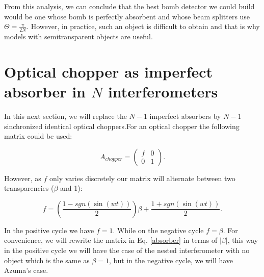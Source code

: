 \documentclass[12pt]{book}
\begin{document}
From this analysis, we can conclude that the best bomb detector we could build would be one whose bomb is perfectly absorbent and whose beam splitters use $\Theta=\frac{\pi}{2 N}$. However, in practice, such an object is difficult to obtain and that is why models with semitransparent objects are useful.
 
\section[Optical chopper]{Optical chopper as imperfect absorber in $N$ interferometers}

In this next section, we will replace the $N-1$ imperfect absorbers by $N-1$ sinchronized identical optical choppers.For an optical chopper the following matrix could be used:

\begin{equation}
A_{chopper}=\begin{pmatrix} f & 0 \\ 0 & 1 \end{pmatrix}.
\end{equation}

However, as $f$ only varies discretely our matrix will alternate between  two transparencies ($\beta$ and 1):

\begin{equation}
f=\left(\frac{1-sgn(\sin(wt))}{2} \right)\beta+\frac{1+sgn(\sin(wt))}{2}.
\end{equation}

In the positive cycle we have $f=1$. While on the negative cycle $f=\beta$. For convenience, we will rewrite the matrix in Eq. \ref{absorber} in terms of $|\beta|$, this way in the positive cycle we will have the case of the nested interferometer with no object which is the same as  $\beta=1$, but in the negative cycle, we will have  Azuma's case.
\end{document}
